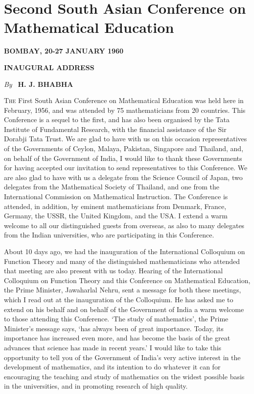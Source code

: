
\chapter{Second South Asian Conference on Mathematical Education}

\begin{center}
\textbf{BOMBAY, 20-27 JANUARY 1960}

\medskip

\textbf{\Large{INAUGURAL ADDRESS}}

\medskip

{\em By~} \textbf{H. J. BHABHA}
\end{center}

\textsc{The} First South Asian Conference on Mathematical Education
was held here in February, 1956, and was attended by 75 mathematicians
from 20 countries. This Conference is a sequel to the first, and has
also been organised by the Tata Institute of Fundamental Research,
with the financial assistance of the Sir Dorabji Tata Trust. We are
glad to have with us on this occasion representatives of the
Governments of Ceylon, Malaya, Pakistan, Singapore and Thailand, and,
on behalf of the Government of India, I would like to thank these
Governments for having accepted our invitation to send representatives
to this Conference. We are also glad to have with us a delegate from
the Science Council of Japan, two delegates from the Mathematical
Society of Thailand, and one from the International Commission on
Mathematical Instruction. The Conference  is attended, in addition, by
eminent mathematicians from Denmark, France, Germany, the USSR, the
United Kingdom, and the USA. I extend a warm welcome to all our
distinguished guests from overseas, as also to many delegates from the
Indian universities, who are participating in this Conference.

About 10 days ago, we had the inauguration of the International
Colloquium on Function Theory and many of the distinguished
mathematicians who attended that meeting are also present with us
today. Hearing of the International Colloquium on Function Theory and
this Conference on Mathematical Education, the Prime Minister,
Jawaharlal Nehru, sent a message for both these meetings, which I read
out at the inauguration of the Colloquium. He has asked me to extend
on his behalf and on behalf of the Government of India a warm welcome
to those attending this Conference. `The study of mathematics', the
Prime Minister's message says, `has always been of great
importance. Today, its importance has increased even more, and has
become the basis of the great advances that science has made in recent
years.' I would like to take this opportunity to tell you of the
Government of India's very active interest in the development of
mathematics, and its intention to do whatever it can for encouraging
the teaching and study of mathematics on the widest possible basis in
the universities, and in promoting research of high quality.

